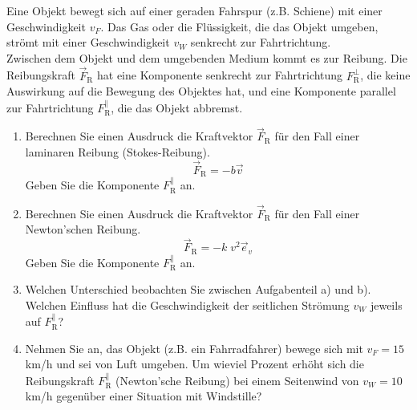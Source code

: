 \begin{ExerciseBlock}
Eine Objekt bewegt sich auf einer geraden Fahrspur (z.B. Schiene) mit einer Geschwindigkeit $v_F$. Das Gas oder die Flüssigkeit, die das Objekt umgeben, strömt mit einer Geschwindigkeit $v_W$ senkrecht zur Fahrtrichtung. \\
Zwischen dem Objekt und dem umgebenden Medium kommt es zur Reibung. Die Reibungskraft $\vec{F}_\mathrm R$ hat eine Komponente senkrecht zur Fahrtrichtung $F_\mathrm R^\perp$, die keine Auswirkung auf die Bewegung des Objektes hat, und eine Komponente parallel zur Fahrtrichtung $F_\mathrm R^{\parallel}$, die das Objekt abbremst.

\begin{center}
\end{center}

\begin{enumerate}
	\item Berechnen Sie einen Ausdruck die Kraftvektor $\vec{F}_\mathrm R$ für den Fall einer laminaren Reibung (Stokes-Reibung).
	\[ \vec{F}_\mathrm R = -b \vec{v} \]
	Geben Sie die Komponente $F_\mathrm R^{\parallel}$ an.

	\item Berechnen Sie einen Ausdruck die Kraftvektor $\vec{F}_\mathrm R$ für den Fall einer Newton'schen Reibung.
	\[ \vec{F}_\mathrm R = - k \; v^2 \vec{e}_v \]
	Geben Sie die Komponente $F_\mathrm R^{\parallel}$ an.

	\item Welchen Unterschied beobachten Sie zwischen Aufgabenteil a) und b). Welchen Einfluss hat die Geschwindigkeit der seitlichen Strömung $v_W$ jeweils auf $F_\mathrm R^{\parallel}$?

	\item Nehmen Sie an, das Objekt (z.B. ein Fahrradfahrer) bewege sich mit $v_F=15\,$km/h und sei von Luft umgeben. Um wieviel Prozent erhöht sich die Reibungskraft $F_\mathrm R^{\parallel}$ (Newton'sche Reibung) bei einem Seitenwind von $v_W=10 \,$km/h gegenüber einer Situation mit Windstille?

\end{enumerate}
\end{ExerciseBlock}
